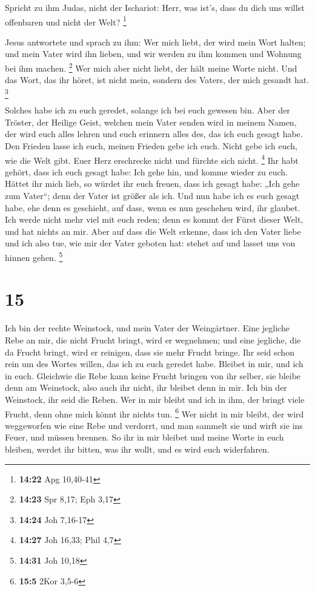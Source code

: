  Spricht zu ihm Judas, nicht der Ischariot: Herr, was
ist's, dass du dich uns willst offenbaren und nicht der Welt?
\footnote{\textbf{14:22} Apg 10,40-41}

 Jesus antwortete und sprach zu ihm: Wer mich liebt, der
wird mein Wort halten; und mein Vater wird ihn lieben, und wir werden zu
ihm kommen und Wohnung bei ihm machen. \footnote{\textbf{14:23} Spr
  8,17; Eph 3,17}  Wer mich aber nicht liebt, der hält
meine Worte nicht. Und das Wort, das ihr höret, ist nicht mein, sondern
des Vaters, der mich gesandt hat. \footnote{\textbf{14:24} Joh 7,16-17}

 Solches habe ich zu euch geredet, solange ich bei euch
gewesen bin.  Aber der Tröster, der Heilige Geist,
welchen mein Vater senden wird in meinem Namen, der wird euch alles
lehren und euch erinnern alles des, das ich euch gesagt habe.
 Den Frieden lasse ich euch, meinen Frieden gebe ich
euch. Nicht gebe ich euch, wie die Welt gibt. Euer Herz erschrecke nicht
und fürchte sich nicht. \footnote{\textbf{14:27} Joh 16,33; Phil 4,7}
 Ihr habt gehört, dass ich euch gesagt habe: Ich gehe
hin, und komme wieder zu euch. Hättet ihr mich lieb, so würdet ihr euch
freuen, dass ich gesagt habe: „Ich gehe zum Vater``; denn der Vater ist
größer als ich.  Und nun habe ich es euch gesagt habe,
ehe denn es geschieht, auf dass, wenn es nun geschehen wird, ihr
glaubet.  Ich werde nicht mehr viel mit euch reden; denn
es kommt der Fürst dieser Welt, und hat nichts an mir. 
Aber auf dass die Welt erkenne, dass ich den Vater liebe und ich also
tue, wie mir der Vater geboten hat: stehet auf und lasset uns von hinnen
gehen. \footnote{\textbf{14:31} Joh 10,18}

\hypertarget{section-5}{%
\section{15}\label{section-5}}

 Ich bin der rechte Weinstock, und mein Vater der
Weingärtner.  Eine jegliche Rebe an mir, die nicht Frucht
bringt, wird er wegnehmen; und eine jegliche, die da Frucht bringt, wird
er reinigen, dass sie mehr Frucht bringe.  Ihr seid schon
rein um des Wortes willen, das ich zu euch geredet habe. 
Bleibet in mir, und ich in euch. Gleichwie die Rebe kann keine Frucht
bringen von ihr selber, sie bleibe denn am Weinstock, also auch ihr
nicht, ihr bleibet denn in mir.  Ich bin der Weinstock,
ihr seid die Reben. Wer in mir bleibt und ich in ihm, der bringt viele
Frucht, denn ohne mich könnt ihr nichts tun. \footnote{\textbf{15:5}
  2Kor 3,5-6}  Wer nicht in mir bleibt, der wird
weggeworfen wie eine Rebe und verdorrt, und man sammelt sie und wirft
sie ins Feuer, und müssen brennen.  So ihr in mir bleibet
und meine Worte in euch bleiben, werdet ihr bitten, was ihr wollt, und
es wird euch widerfahren.

